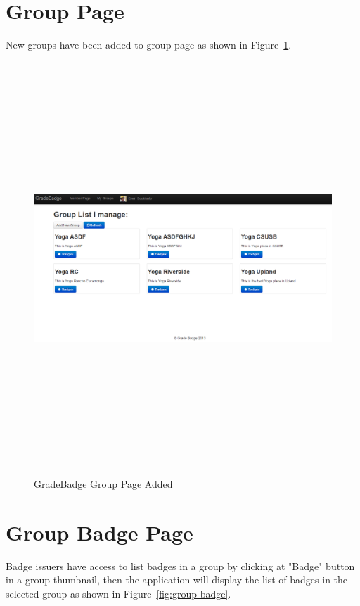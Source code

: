 \newpage
\section{Group Page}
New groups have been added to group page as shown in Figure~\ref{fig:group-page2}. 

\vspace{3em}
\begin{figure}[H]
\begin{center}
\includegraphics[height=6.1in,width=6.5in]{images/group-page2.png}
\caption{GradeBadge Group Page Added}
\label{fig:group-page2}
\end{center}
\end{figure}

\newpage
\section{Group Badge Page}
Badge issuers have access to list badges in a group by clicking at "Badge" button in a group thumbnail, then the application will display the list of badges in the selected group  as shown in Figure~\ref{fig:group-badge}. 

